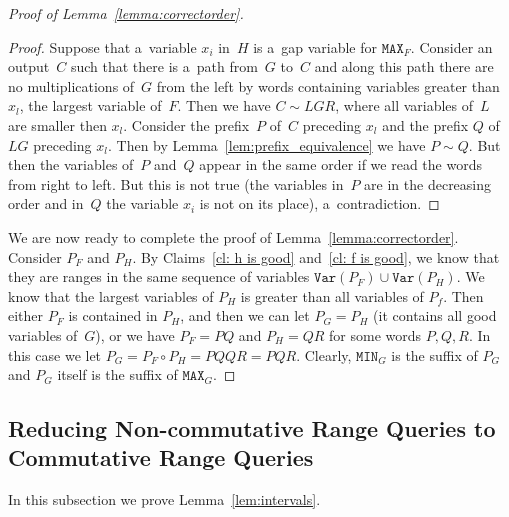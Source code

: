 \documentclass[11pt,letterpaper]{article}
\newcommand{\mmin}{\texttt{MIN}}
\newcommand{\mmax}{\texttt{MAX}}
\newcommand{\var}{\texttt{Var}}
\begin{document}
\begin{proof}[Proof of Lemma~\ref{lemma:correctorder}]
\begin{proof}
Suppose that a~variable $x_i$ in~$H$ is a~gap variable for $\mmax_F$. Consider an output~$C$ such that there is a~path from~$G$ to~$C$ and along this path there are no multiplications of~$G$ from the left by words containing variables greater than $x_l$, the largest variable of~$F$. Then we have $C \sim LGR$, where all variables of~$L$ are smaller then $x_l$. Consider the prefix~$P$ of~$C$ preceding $x_l$ and the prefix $Q$ of $LG$ preceding $x_l$.
Then by Lemma~\ref{lem:prefix_equivalence} we have $P \sim Q$. But then the variables of~$P$ and~$Q$ appear in the same order if we read the words from right to left. But this is not true (the variables in~$P$ are in the decreasing order and in~$Q$ the variable $x_i$ is not on its place), a~contradiction.
\end{proof}

We are now ready to complete the proof of Lemma~\ref{lemma:correctorder}.
Consider $P_F$ and $P_H$. By Claims~\ref{cl: h is good} and~\ref{cl: f is good}, we know that they are ranges in the same sequence of variables $\var(P_F)\cup \var(P_H)$. We know that the largest variables of $P_H$ is greater than all variables of $P_f$. Then either $P_F$ is contained in $P_H$, and then we can let $P_G=P_H$ (it contains all good variables of~$G$), or we have $P_F =PQ$ and $P_H=QR$ for some words $P, Q, R$. In this case we let $P_G = P_F \circ P_H = PQQR=PQR$. Clearly, $\mmin_G$ is the suffix of $P_G$ and $P_G$ itself is the suffix of $\mmax_G$.
\end{proof}



\subsection{Reducing Non-commutative Range Queries to Commutative Range Queries} \label{sec:non-commutative_to_commutative}

In this subsection we prove Lemma~\ref{lem:intervals}.
\end{document}
